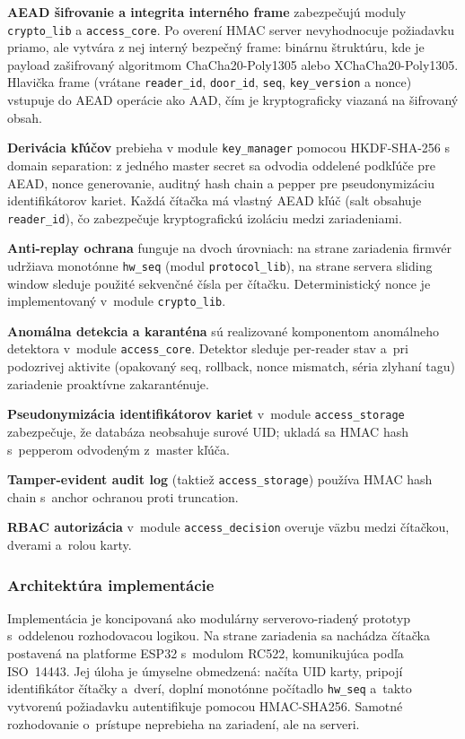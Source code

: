 \textbf{AEAD šifrovanie a integrita interného frame} zabezpečujú moduly \texttt{crypto\_lib} a \texttt{access\_core}. Po overení HMAC server nevyhodnocuje požiadavku priamo, ale vytvára z nej interný bezpečný frame: binárnu štruktúru, kde je payload zašifrovaný algoritmom ChaCha20-Poly1305 alebo XChaCha20-Poly1305. Hlavička frame (vrátane \texttt{reader\_id}, \texttt{door\_id}, \texttt{seq}, \texttt{key\_version} a nonce) vstupuje do AEAD operácie ako AAD, čím je kryptograficky viazaná na šifrovaný obsah.

\textbf{Derivácia kľúčov} prebieha v module \texttt{key\_manager} pomocou HKDF-SHA-256 s domain separation: z jedného master secret sa odvodia oddelené podkľúče pre AEAD, nonce generovanie, auditný hash chain a pepper pre pseudonymizáciu identifikátorov kariet. Každá čítačka má vlastný AEAD kľúč (salt obsahuje \texttt{reader\_id}), čo zabezpečuje kryptografickú izoláciu medzi zariadeniami.

\textbf{Anti-replay ochrana} funguje na dvoch úrovniach: na strane zariadenia firmvér udržiava monotónne \texttt{hw\_seq} (modul \texttt{protocol\_lib}), na strane servera sliding window sleduje použité sekvenčné čísla per čítačku. Deterministický nonce je implementovaný v~module \texttt{crypto\_lib}.

\textbf{Anomálna detekcia a karanténa} sú realizované komponentom anomálneho detektora v~module \texttt{access\_core}. Detektor sleduje per-reader stav a~pri podozrivej aktivite (opakovaný seq, rollback, nonce mismatch, séria zlyhaní tagu) zariadenie proaktívne zakaranténuje.

\textbf{Pseudonymizácia identifikátorov kariet} v~module \texttt{access\_storage} zabezpečuje, že databáza neobsahuje surové UID; ukladá sa HMAC hash s~pepperom odvodeným z~master kľúča.

\textbf{Tamper-evident audit log} (taktiež \texttt{access\_storage}) používa HMAC hash chain s~anchor ochranou proti truncation.

\textbf{RBAC autorizácia} v~module \texttt{access\_decision} overuje väzbu medzi čítačkou, dverami a~rolou karty.

\subsubsection{Architektúra implementácie}

Implementácia je koncipovaná ako modulárny serverovo-riadený prototyp s~oddelenou rozhodovacou logikou. Na strane zariadenia sa nachádza čítačka postavená na platforme ESP32\cite{Espressif2024} s~modulom RC522, komunikujúca podľa ISO~14443\cite{ISO14443}. Jej úloha je úmyselne obmedzená: načíta UID karty, pripojí identifikátor čítačky a~dverí, doplní monotónne počítadlo \texttt{hw\_seq} a~takto vytvorenú požiadavku autentifikuje pomocou HMAC-SHA256. Samotné rozhodovanie o~prístupe neprebieha na zariadení, ale na serveri.

